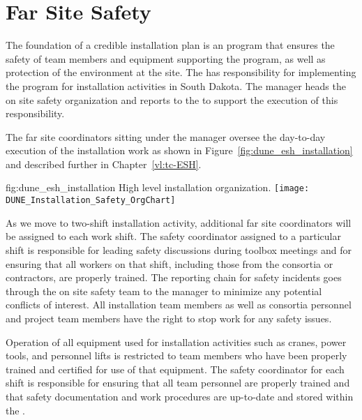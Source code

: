 \section{Far Site Safety}
\label{sec:far_site_safety}

The foundation of a credible installation plan is an 
program that ensures the safety of team members and
equipment supporting the program, as well as protection of the environment at
the  site.  The  has responsibility for
implementing the   program for 
installation activities in South Dakota.  The 
 manager heads the on site safety organization and reports
to the  to support the execution of this
responsibility.

The far site  coordinators sitting under the
  manager oversee the day-to-day execution
of the installation work as shown in
Figure~\ref{fig:dune_esh_installation} and described further in
Chapter~\ref{vl:tc-ESH}.
\begin{dunefigure}{fig:dune_esh_installation}
  {High level  installation  organization.}
  \texttt{[image: DUNE\_Installation\_Safety\_OrgChart]}
\end{dunefigure}
As we move to two-shift installation activity, additional far site  
coordinators will be assigned to each work shift.  The safety coordinator 
assigned to a particular shift is responsible for leading safety discussions 
during  toolbox meetings and for ensuring that all workers on that shift, 
including those from the consortia or contractors, are properly trained.  The 
reporting chain for safety incidents goes through the on site safety team to 
the   manager to minimize any potential conflicts 
of interest.  All  installation team members as well as  
consortia personnel and  project team members have the right to 
stop work for any safety issues.

Operation of all equipment used for installation activities such as
cranes, power tools, and personnel lifts is restricted to team members
who have been properly trained and certified for use of that
equipment.  The safety coordinator for each shift is responsible for
ensuring that all team personnel are properly trained and that safety
documentation and work procedures are up-to-date and stored within the
.

